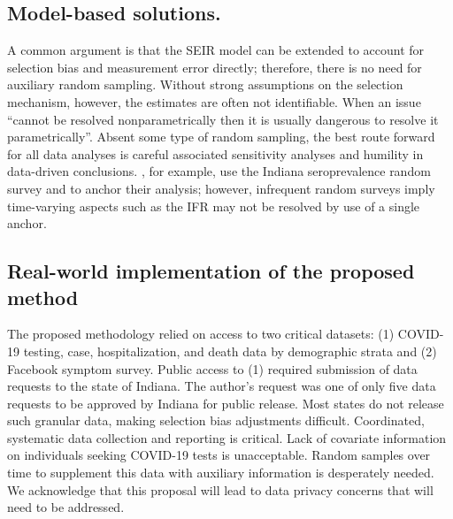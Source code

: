 \documentclass[11pt]{amsart}
\numberwithin{equation}{section}
\theoremstyle{plain}
\begin{document}
 \subsection*{Model-based solutions.}

 A common argument is that the SEIR model can be extended to account for selection bias and measurement error directly; therefore, there is no need for auxiliary random sampling.  Without strong assumptions on the selection mechanism, however, the estimates are often not identifiable.  When an issue ``cannot be resolved nonparametrically then it is usually dangerous to resolve it parametrically''\citep{CoxHink74}. Absent some type of random sampling, the best route forward for all data analyses is careful associated sensitivity analyses and humility in data-driven conclusions.  \cite{Ironse2103272118}, for example, use the Indiana seroprevalence random survey and to anchor their analysis; however, infrequent random surveys imply time-varying aspects such as the IFR may not be resolved by use of a single anchor.


 \subsection*{Real-world implementation of the proposed method}

 The proposed methodology relied on access to two critical datasets: (1) COVID-19 testing, case, hospitalization, and death data by demographic strata and (2) Facebook symptom survey.  Public access to (1) required submission of data requests to the state of Indiana.  The author's request was one of only five data requests to be approved by Indiana for public release.  Most states do not release such granular data, making selection bias adjustments difficult.  Coordinated, systematic data collection and reporting is critical.
 Lack of covariate information on individuals seeking COVID-19 tests is unacceptable.  Random samples over time to supplement this data with auxiliary information is desperately needed.  We acknowledge that this proposal will lead to data privacy concerns that will need to be addressed.

\end{document}
